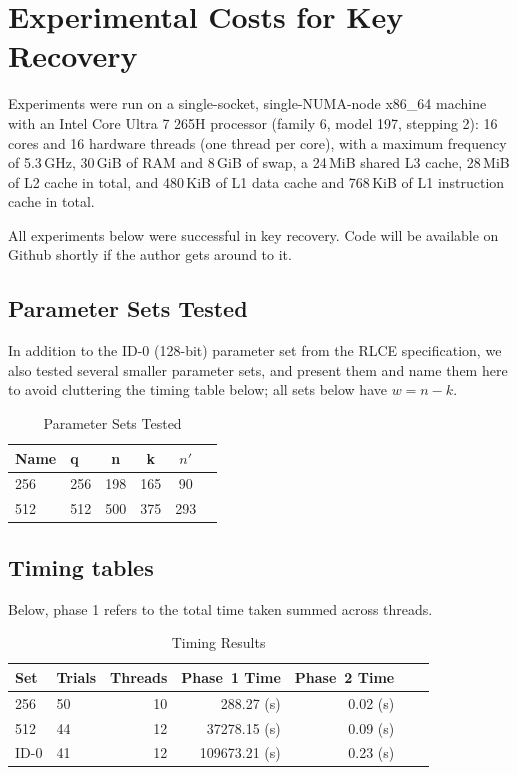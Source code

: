 \section{Experimental Costs for Key Recovery}
\label{sec:total-costs}

Experiments were run on a single-socket, single-NUMA-node x86\_64 machine with
an Intel Core Ultra 7 265H processor (family 6, model 197, stepping 2): 16
cores and 16 hardware threads (one thread per core), with a maximum frequency
of 5.3\,GHz, 30\,GiB of RAM and 8\,GiB of swap, a 24\,MiB shared L3 cache,
28\,MiB of L2 cache in total, and 480\,KiB of L1 data cache and 768\,KiB of L1
instruction cache in total.

All experiments below were successful in key recovery. Code will be available on Github shortly if the 
author gets around to it. 

\subsection{Parameter Sets Tested}\label{sec:param-sets}

In addition to the ID-0 (128-bit) parameter set from the RLCE specification, we
also tested several smaller parameter sets, and present them and name them here
to avoid cluttering the timing table below; all sets below have $w=n-k$. 


\begin{table}[!ht]
\caption{Parameter Sets Tested}
\begin{center}
\begin{tabular}{llcccc}
\toprule
Name        & q & n & k & $n'$\\
\midrule
256  & 256 & 198 & 165 & 90\\
512  & 512 & 500 & 375 & 293\\
\bottomrule
\end{tabular}
\end{center}
\end{table}

\subsection{Timing tables}\label{sec:timing}

Below, phase 1 refers to the total time taken summed across threads.
\begin{table}[!ht]
\caption{Timing Results}
\begin{center}
    \footnotesize
    \begin{tabular}{llrrrrr}
        \toprule
        Set                           & Trials             & Threads & Phase~1 Time & Phase~2 Time \\
        \midrule
        256 & 50 & 10 & 288.27 (s) & 0.02 (s)\\
        512 & 44 & 12 & 37278.15 (s) & 0.09 (s) \\
        ID-0    & 41             & 12   & 109673.21 (s)        & 0.23 (s)     \\
        \bottomrule
    \end{tabular}
\end{center}
\end{table}